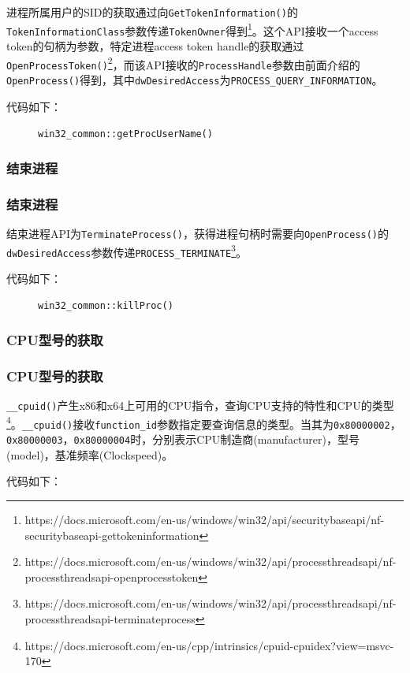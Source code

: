 \documentclass{beamer}
\newcommand\code[1]{\texttt{#1}}
\begin{document}
\begin{frame}
进程所属用户的SID的获取通过向\code{GetTokenInformation()}的\code{TokenInformationClass}参数传递\code{TokenOwner}得到\footnote{https://docs.microsoft.com/en-us/windows/win32/api/securitybaseapi/nf-securitybaseapi-gettokeninformation}。这个API接收一个access token的句柄为参数，特定进程access token handle的获取通过\code{OpenProcessToken()}\footnote{https://docs.microsoft.com/en-us/windows/win32/api/processthreadsapi/nf-processthreadsapi-openprocesstoken}，而该API接收的\code{ProcessHandle}参数由前面介绍的\code{OpenProcess()}得到，其中\code{dwDesiredAccess}为\code{PROCESS\_QUERY\_INFORMATION}。
\end{frame}

\begin{frame}
代码如下：

\begin{figure}[H]
    \ttfamily
    
    \caption{\code{win32\_common::getProcUserName()}}
\end{figure}
\end{frame}

\subsubsection{结束进程}
\begin{frame}
    \frametitle{结束进程}
    结束进程API为\code{TerminateProcess()}，获得进程句柄时需要向\code{OpenProcess()}的\code{dwDesiredAccess}参数传递\code{PROCESS\_TERMINATE}\footnote{https://docs.microsoft.com/en-us/windows/win32/api/processthreadsapi/nf-processthreadsapi-terminateprocess}。

代码如下：

\begin{figure}[H]
    \ttfamily
    
    \caption{\code{win32\_common::killProc()}}
\end{figure}
\end{frame}

\subsubsection{CPU型号的获取}
\begin{frame}
    \frametitle{CPU型号的获取}
    \code{\_\_cpuid()}产生x86和x64上可用的CPU指令，查询CPU支持的特性和CPU的类型\footnote{https://docs.microsoft.com/en-us/cpp/intrinsics/cpuid-cpuidex?view=msvc-170}。\code{\_\_cpuid()}接收\code{function\_id}参数指定要查询信息的类型。当其为\code{0x80000002}，\code{0x80000003}，\code{0x80000004}时，分别表示CPU制造商(manufacturer)，型号(model)，基准频率(Clockspeed)。

代码如下：

{
    \ttfamily
    
}
\end{frame}
\end{document}
